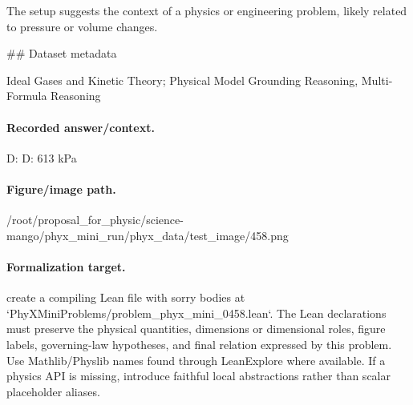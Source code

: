 The setup suggests the context of a physics or engineering problem, likely related to pressure or volume changes.

\#\# Dataset metadata

Ideal Gases and Kinetic Theory; Physical Model Grounding Reasoning, Multi-Formula Reasoning

\paragraph{Recorded answer/context.}
D: D: 613 kPa

\paragraph{Figure/image path.}
/root/proposal\_for\_physic/science-mango/phyx\_mini\_run/phyx\_data/test\_image/458.png

\paragraph{Formalization target.}
create a compiling Lean file with sorry bodies at `PhyXMiniProblems/problem\_phyx\_mini\_0458.lean`. The Lean declarations must preserve the physical quantities, dimensions or dimensional roles, figure labels, governing-law hypotheses, and final relation expressed by this problem.
Use Mathlib/Physlib names found through LeanExplore where available. If a physics API is missing, introduce faithful local abstractions rather than scalar placeholder aliases.

